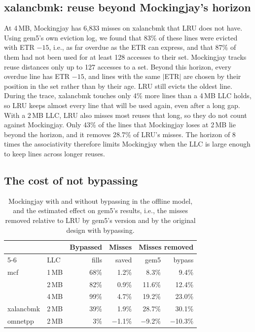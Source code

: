 \documentclass[11pt,conference]{IEEEtran}
\begin{document}
\subsection{xalancbmk: reuse beyond Mockingjay's horizon}
\label{sec:xalanc}

At 4\,MB, Mockingjay has 6,833 misses on xalancbmk that LRU does not have. Using
gem5's own eviction log, we found that 83\% of these lines were evicted with
ETR $-15$, i.e., as far overdue as the ETR can express, and that 87\% of them had
not been used for at least 128 accesses to their set. Mockingjay tracks reuse
distances only up to 127 accesses to a set. Beyond this horizon, every
overdue line has ETR $-15$, and lines with the same $|$ETR$|$ are chosen by
their position in the set rather than by their age. LRU still evicts the
oldest line. During the trace, xalancbmk touches only 4\% more lines than a
4\,MB LLC holds, so LRU keeps almost every line that will be used again, even
after a long gap. With a 2\,MB LLC, LRU also misses most reuses that long, so
they do not count against Mockingjay. Only 43\% of the lines that Mockingjay
loses at 2\,MB lie beyond the horizon, and it removes 28.7\% of LRU's misses.
The horizon of 8 times the associativity therefore limits Mockingjay when the
LLC is large enough to keep lines across longer reuses.

\subsection{The cost of not bypassing}
\label{sec:bypass}

\begin{table}[t]
\centering
\caption{Mockingjay with and without bypassing in the offline model, and the
estimated effect on gem5's results, i.e., the misses removed relative to
LRU by gem5's version and by the original design with bypassing.}
\label{tab:bypass}
\setlength{\tabcolsep}{3pt}
\begin{tabular}{@{}llrrrr@{}}
\toprule
& & Bypassed & Misses & \multicolumn{2}{c}{Misses removed} \\
\cmidrule(l){5-6}
& LLC & fills & saved & gem5 & bypass \\
\midrule
mcf & 1\,MB & 68\% & 1.2\% & 8.3\% & 9.4\% \\
& 2\,MB & 82\% & 0.9\% & 11.6\% & 12.4\% \\
& 4\,MB & 99\% & 4.7\% & 19.2\% & 23.0\% \\
xalancbmk & 2\,MB & 39\% & 1.9\% & 28.7\% & 30.1\% \\
omnetpp & 2\,MB & 3\% & $-$1.1\% & $-$9.2\% & $-$10.3\% \\
\bottomrule
\end{tabular}
\end{table}
\end{document}
